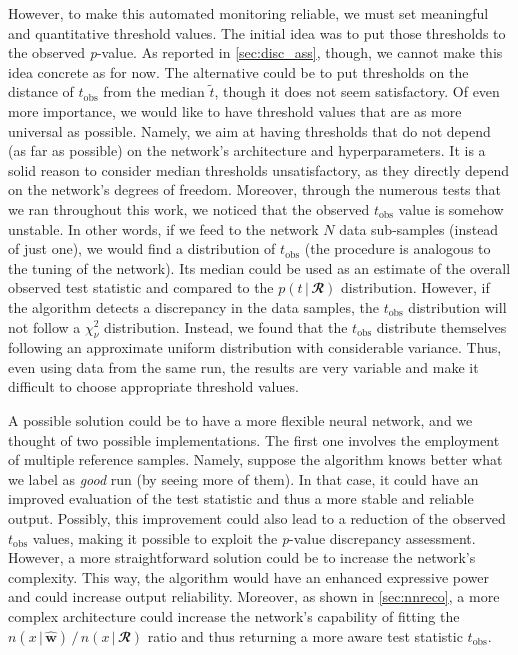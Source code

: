 However, to make this automated monitoring reliable, we must set meaningful and quantitative threshold values. The
initial idea was to put those thresholds to the observed \textit{p}-value. As reported in \autoref{sec:disc_ass},
though, we cannot make this idea concrete as for now. The alternative could be to put thresholds on the distance of
$t_{\text{obs}}$ from the median $\tilde{t}$, though it does not seem satisfactory. Of even more importance, we would
like to have threshold values that are as more universal as possible. Namely, we aim at having thresholds that do not
depend (as far as possible) on the network's architecture and hyperparameters. It is a solid reason to consider median
thresholds unsatisfactory, as they directly depend on the network's degrees of freedom. Moreover, through the numerous
tests that we ran throughout this work, we noticed that the observed $t_{\text{obs}}$ value is somehow unstable. In
other words, if we feed to the network $N$ data sub-samples (instead of just one), we would find a distribution of
$t_{\text{obs}}$ (the procedure is analogous to the tuning of the network). Its median could be used as an estimate of
the overall observed test statistic and compared to the $p(t\,|\,\mathbfcal{R})$ distribution. However, if the algorithm
detects a discrepancy in the data samples, the $t_{\text{obs}}$ distribution will not follow a $\chi^2_{\nu}$
distribution. Instead, we found that the $t_{\text{obs}}$ distribute themselves following an approximate uniform
distribution with considerable variance. Thus, even using data from the same run, the results are very variable and make
it difficult to choose appropriate threshold values. 

A possible solution could be to have a more flexible neural network, and we thought of two possible implementations. The
first one involves the employment of multiple reference samples. Namely, suppose the algorithm knows better what we
label as \textit{good} run (by seeing more of them). In that case, it could have an improved evaluation of the test
statistic and thus a more stable and reliable output. Possibly, this improvement could also lead to a reduction of the
observed $t_{\text{obs}}$ values, making it possible to exploit the \textit{p}-value discrepancy assessment. However, a
more straightforward solution could be to increase the network's complexity. This way, the algorithm would have an
enhanced expressive power and could increase output reliability. Moreover, as shown in \autoref{sec:nnreco}, a more
complex architecture could increase the network's capability of fitting the $n(x\,|\,\widehat{\mathbf{w}}) \, / \,
n(x\,|\,\mathbfcal{R})$ ratio and thus returning a more aware test statistic $t_{\text{obs}}$.


